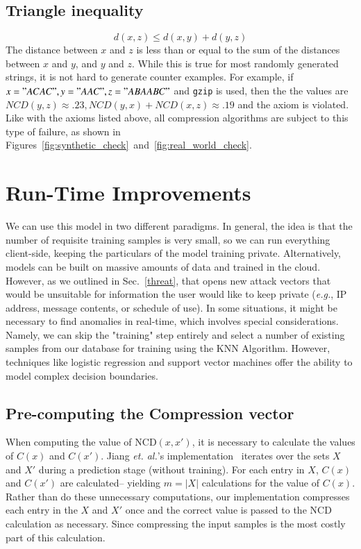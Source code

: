 \documentclass[preprint,12pt]{elsarticle}
\begin{document}
\subsection{Triangle inequality} 
$$
    d(x, z) \leq d(x, y) + d(y, z)
$$
The distance between $x$ and $z$ is less than or equal to the sum of the distances between $x$ and $y$, and $y$ and $z$. While this is true for most randomly generated strings, it is not hard to generate counter examples.
For example, if $ x = "ACAC", y = "AAC", z = "ABAABC" $ and \texttt{gzip} is used, then the the values are $ NCD(y,z) \approx .23, NCD(y,x) + NCD(x,z) \approx .19 $ and the axiom is violated. 
Like with the axioms listed above, all compression algorithms are subject to this type of failure, as shown in Figures~\ref{fig:synthetic_check}~and~\ref{fig:real_world_check}.


\section{Run-Time Improvements}
\label{improvements}
We can use this model in two different paradigms. In general, the idea is that the number of requisite training samples is very small, so we can run everything client-side, keeping the particulars of the model training private. 
Alternatively, models can be built on massive amounts of data and trained in the cloud. 
However, as we outlined in Sec.~\ref{threat}, that opens new attack vectors that would be unsuitable for information the user would like to keep private (\textit{e.g.}, IP address, message contents, or schedule of use). 
In some situations, it might be necessary to find anomalies in real-time, which involves special considerations. 
Namely, we can skip the "training" step entirely and select a number of existing samples from our database for training using the KNN Algorithm.
However, techniques like logistic regression and support vector machines offer the ability to model complex decision boundaries. 



\subsection{Pre-computing the Compression vector}
When computing the value of NCD$(x,x')$, it is necessary to calculate the values of $C(x)$ and $C(x')$. 
Jiang \textit{et. al.}'s implementation~\cite{jiang2022less} iterates over the sets $X$ and $X'$ during a prediction stage (without training). 
For each entry in $X$, $C(x)$  and $C(x')$ are calculated-- yielding $m = | X |$ calculations for the value of $C(x)$. 
Rather than do these unnecessary computations, our implementation compresses each entry in the $X$ and $X'$ once and the correct value is passed to the NCD calculation as necessary. 
Since compressing the input samples is the most costly part of this calculation. 
\end{document}
